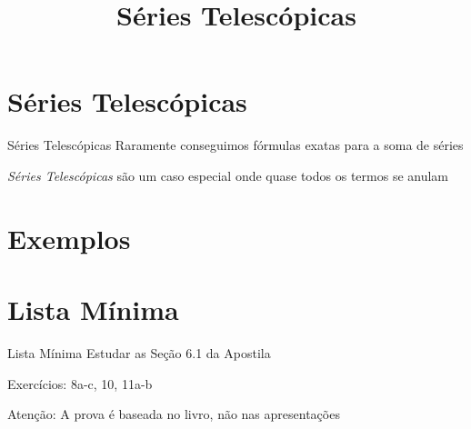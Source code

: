 \documentclass[fleqn,utf8,aspectratio=169,12pt]{beamer}
\title{Séries Telescópicas}
\begin{document}
\addtitle

\section{Séries Telescópicas}

\begin{frame}{Séries Telescópicas}
	Raramente conseguimos fórmulas exatas para a soma de séries

	\pause
	\vspace{\baselineskip}
	\emph{Séries Telescópicas} são um caso especial onde quase todos os termos se anulam
\end{frame}

\section{Exemplos}




\section{Lista Mínima}

\begin{frame}{Lista Mínima}
  Estudar as Seção 6.1 da Apostila

  \vspace{\baselineskip}
  Exercícios: 8a-c, 10, 11a-b

  \vfill
  Atenção: A prova é baseada no livro, não nas apresentações
\end{frame}

\end{document}
